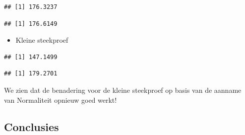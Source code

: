 \documentclass[
  12pt,dutch]{book}
\newenvironment{Shaded}{\begin{snugshade}}{\end{snugshade}}
\newcommand{\AttributeTok}[1]{\textcolor[rgb]{0.13,0.29,0.53}{#1}}
\newcommand{\DecValTok}[1]{\textcolor[rgb]{0.00,0.00,0.81}{#1}}
\newcommand{\FloatTok}[1]{\textcolor[rgb]{0.00,0.00,0.81}{#1}}
\newcommand{\FunctionTok}[1]{\textcolor[rgb]{0.13,0.29,0.53}{\textbf{#1}}}
\newcommand{\NormalTok}[1]{#1}
\newcommand{\SpecialCharTok}[1]{\textcolor[rgb]{0.81,0.36,0.00}{\textbf{#1}}}
\providecommand{\tightlist}{%
  \setlength{\itemsep}{0pt}\setlength{\parskip}{0pt}}
\theoremstyle{definition}
\theoremstyle{definition}
\theoremstyle{definition}
\theoremstyle{definition}
\theoremstyle{remark}
\begin{document}
\begin{verbatim}
## [1] 176.3237
\end{verbatim}

\begin{Shaded}
\end{Shaded}

\begin{verbatim}
## [1] 176.6149
\end{verbatim}

\begin{itemize}
\tightlist
\item
  Kleine steekproef
\end{itemize}

\begin{Shaded}
\end{Shaded}

\begin{verbatim}
## [1] 147.1499
\end{verbatim}

\begin{Shaded}
\end{Shaded}

\begin{verbatim}
## [1] 179.2701
\end{verbatim}

We zien dat de benadering voor de kleine steekproef op basis van de aanname van Normaliteit opnieuw goed werkt!

\subsection{Conclusies}\label{conclusies-1}
\end{document}
